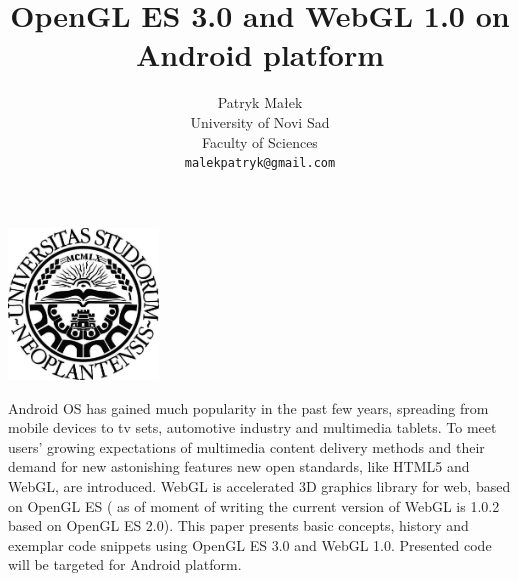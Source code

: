 \documentclass[a4paper,12pt]{article}
\renewenvironment{abstract}
 {\small
  \begin{center}
  \bfseries \abstractname\vspace{-.5em}\vspace{0pt}
  \end{center}
  \list{}{
    \setlength{\leftmargin}{1cm}%
    \setlength{\rightmargin}{\leftmargin}%
  }%
  \item\relax}
 {\endlist}
\begin{document}


\title{OpenGL ES 3.0 and WebGL 1.0 on Android platform}
\author{Patryk Małek\\
        University of Novi Sad\\
        Faculty of Sciences\\
        \texttt{malekpatryk@gmail.com}
        }
\date{}         %
\maketitle



\vspace{5pc}

\centerline{
\includegraphics[width=0.3\textwidth,height=0.3\textheight,keepaspectratio]{NoviSadLogoGray.jpg}
}

\vspace{5pc}

\begin{abstract}
\label{Abstract}
Android OS has gained much popularity in the past few years, spreading from mobile devices to tv sets, automotive industry and multimedia tablets. 
To meet users' growing expectations of multimedia content delivery methods and their demand for new astonishing features new open standards, like HTML5 and WebGL, are introduced. 
WebGL is accelerated 3D graphics library for web, based on OpenGL ES ( as of moment of writing the current version of WebGL is 1.0.2 based on OpenGL ES 2.0).
This paper presents basic concepts, history and exemplar code snippets using OpenGL ES 3.0 and WebGL 1.0.
Presented code will be targeted for Android platform.
\end{abstract}

\pagebreak


\end{document}
